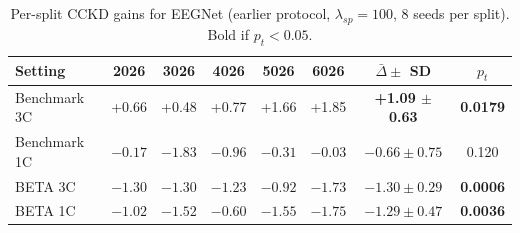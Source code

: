 \documentclass[10pt]{article} %
\begin{document}
\begin{table}[h]
\caption{Per-split CCKD gains for EEGNet (earlier protocol, $\lambda_{sp}=100$, 8 seeds per split). Bold if $p_t<0.05$.}
\label{tab:eegnet_multisplit}
\begin{center}
\footnotesize
\begin{tabular}{lccccccc}
\toprule
Setting & 2026 & 3026 & 4026 & 5026 & 6026 & $\bar\Delta \pm$ SD & $p_t$ \\
\midrule
Benchmark 3C & +0.66 & +0.48 & +0.77 & +1.66 & +1.85 & \textbf{+1.09 $\pm$ 0.63} & \textbf{0.0179} \\
Benchmark 1C & $-0.17$ & $-1.83$ & $-0.96$ & $-0.31$ & $-0.03$ & $-0.66 \pm 0.75$ & 0.120 \\
BETA 3C & $-1.30$ & $-1.30$ & $-1.23$ & $-0.92$ & $-1.73$ & \textbf{$-1.30 \pm 0.29$} & \textbf{0.0006} \\
BETA 1C & $-1.02$ & $-1.52$ & $-0.60$ & $-1.55$ & $-1.75$ & \textbf{$-1.29 \pm 0.47$} & \textbf{0.0036} \\
\bottomrule
\end{tabular}
\end{center}
\end{table}
\end{document}
